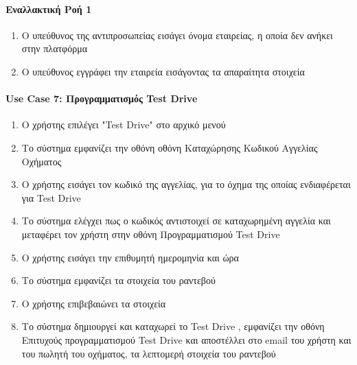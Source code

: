 \documentclass{../ol-softwaremanual}
\begin{document}
	\paragraph{Εναλλακτική Ροή 1}
	
	\begin{enumerate}
		\item Ο υπεύθυνος της αντιπροσωπείας εισάγει όνομα εταιρείας, η οποία δεν ανήκει στην πλατφόρμα
		\item Ο υπεύθυνος εγγράφει την εταιρεία εισάγοντας τα απαραίτητα στοιχεία
	\end{enumerate}

	
	\paragraph{\en Use Case 7: \gr Προγραμματισμός \en Test Drive \gr}
	
	\begin{enumerate}
		\item Ο χρήστης επιλέγει \en"Test Drive" \gr στο αρχικό μενού
		\item Το σύστημα εμφανίζει την οθόνη οθόνη Καταχώρησης Κωδικού Αγγελίας Οχήματος
		\item Ο χρήστης εισάγει τον κωδικό της αγγελίας, για το όχημα της οποίας ενδιαφέρεται για \en Test Drive \gr
		\item Το σύστημα ελέγχει πως ο κωδικός αντιστοιχεί σε καταχωρημένη αγγελία και μεταφέρει τον χρήστη στην οθόνη Προγραμματισμού \en Test Drive \gr
		\item Ο χρήστης εισάγει την επιθυμητή ημερομηνία και ώρα
		\item Το σύστημα εμφανίζει τα στοιχεία του ραντεβού
		\item Ο χρήστης επιβεβαιώνει τα στοιχεία
		\item Το σύστημα δημιουργεί και καταχωρεί το \en Test Drive \gr, εμφανίζει την οθόνη Επιτυχούς προγραμματισμού \en Test Drive \gr και αποστέλλει στο \en email \gr του χρήστη και του πωλητή του οχήματος, τα λεπτομερή στοιχεία του ραντεβού 
	\end{enumerate}
	
\end{document}
